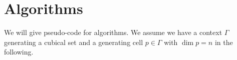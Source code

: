 \section{Algorithms}

We will give pseudo-code for algorithms. We assume we have a context $\Gamma$
generating a cubical set and a generating cell $p \in \Gamma$ with $\dim{p} = n$ in the
following.


    


    



    
